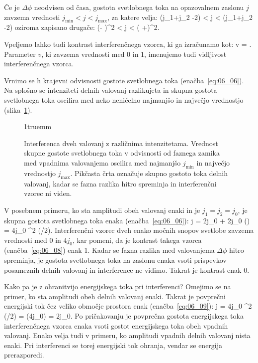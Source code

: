 Če je $\Delta \phi$ neodvisen od časa, gostota svetlobnega toka na opazovalnem zaslonu $j$
zavzema vrednosti $j_\mathrm{min}<j<j_\mathrm{max}$, za katere velja:
\beq
\left(j_1+j_2 -2\right) < j < \left(j_1+j_2 -2\right)
\label{eq:06_07}
\eeq
oziroma zapisano drugače:
\beq
\left(- \right)^2 < j < \left( +\right)^2\!\!.
\label{eq:06_07a}
\eeq
\begin{remark}
Vpeljemo lahko tudi kontrast interferenčnega vzorca, ki ga izračunamo kot:
\beq
v = .
\label{eq:06_08}
\eeq
Parameter $v$, ki zavzema vrednosti med 0 in 1, imenujemo tudi
vidljivost interferenčnega vzorca.
\end{remark}

Vrnimo se h krajevni odvisnosti gostote svetlobnega toka (enačba~\ref{eq:06_06}). Na
splošno se intenziteti delnih valovanj razlikujeta in skupna gostota svetlobnega
toka oscilira med neko neničelno najmanjšo in največjo vrednostjo (slika~\ref{fig:06_kontrast}).
\begin{figure}[h!]
\centering
\def\svgwidth{85truemm} 

\vglue1truemm
\caption{Interferenca dveh valovanj z različnima intenzitetama. 
Vrednost skupne gostote svetlobnega toka v odvisnosti od faznega 
zamika med vpadnima valovanjema oscilira med najmanjšo $j_\mathrm{min}$ 
in največjo vrednostjo $j_\mathrm{max}$. Pikčasta črta označuje skupno
gostoto toka delnih valovanj, kadar se fazna razlika hitro spreminja
in interferenčni vzorec ni viden.}
\label{fig:06_kontrast}
\end{figure}

V posebnem primeru, ko sta amplitudi obeh valovanj enaki in je $j_1 = j_2 = j_0$, 
je skupna gostota svetlobnega toka enaka (enačba~\ref{eq:06_06}):
\beq
j = 2j_0 + 2j_0 \cos (\Delta \phi) = 4j_0 \cos^2 (\Delta \phi/2).
\label{eq:06_09}
\eeq
Interferenčni vzorec dveh enako močnih snopov svetlobe zavzema vrednosti med 0 
in $4j_0$, kar pomeni, da je kontrast takega vzorca (enačba~\ref{eq:06_08}) enak 1. 
Kadar se fazna razlika med valovanjema $\Delta \phi$ hitro spreminja,
je gostota svetlobnega toka na zaslonu enaka vsoti prispevkov posameznih 
delnih valovanj in interference ne vidimo. Takrat je kontrast enak 0. 

Kako pa je z ohranitvijo energijskega toka pri interferenci? Omejimo 
se na primer, ko sta amplitudi obeh delnih valovanj enaki. Takrat
je povprečni energijski  tok čez veliko območje prostora enak (enačba~\ref{eq:06_09}):
\beq
\langle j \rangle = \langle 4j_0 \cos^2 (\Delta \phi/2) \rangle  = (4j_0) = 2j_0.
\label{eq:06_10}
\eeq
Po pričakovanju je povprečna gostota energijskega toka interferenčnega vzorca
enaka vsoti gostot energijskega toka obeh vpadnih valovanj. Enako velja tudi 
v primeru, ko amplitudi vpadnih delnih valovanj nista enaki. Pri interferenci se 
torej energijski tok ohranja, vendar se energija prerazporedi.

